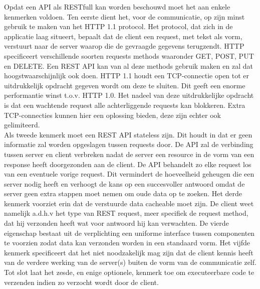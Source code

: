 Opdat een API als RESTfull kan worden beschouwd moet het aan enkele kenmerken voldoen.\newline
Ten eerste dient het, voor de communicatie, op zijn minst gebruik te maken van het HTTP 1.1 protocol. Het protocol, dat zich in de applicatie laag situeert,
bepaalt dat de client een request, met tekst als vorm, verstuurt naar de server waarop die de gevraagde gegevens terugzendt.
HTTP specificeert verschillende soorten requests methods waaronder GET, POST, PUT en DELETE. Een REST API kan van al deze methods gebruik maken en zal dat
hoogstwaarschijnlijk ook doen. HTTP 1.1 houdt een TCP-connectie open tot er uitdrukkelijk opdracht gegeven wordt om deze te sluiten.
Dit geeft een enorme performantie winst t.o.v. HTTP 1.0. Het nadeel van deze uitdrukkelijke opdracht is dat een wachtende request alle achterliggende requests kan blokkeren.
Extra TCP-connecties kunnen hier een oplossing bieden, deze zijn echter ook gelimiteerd.\newline
~\autocite{w3Protocol}\\
Als tweede kenmerk moet een REST API stateless zijn. Dit houdt in dat er geen informatie zal worden opgeslagen tussen requests door.
De API zal de verbinding tussen server en client verbreken nadat de server een resource in de vorm van een response heeft doorgezonden aan de client.
De API behandelt zo elke request los van een eventuele vorige request. Dit vermindert de hoeveelheid geheugen die een server nodig heeft en verhoogt de
kans op een succesvoller antwoord omdat de server geen extra stappen moet nemen om oude data op te zoeken.\newline
Het derde kenmerk voorziet erin dat de verstuurde data cacheable moet zijn. De client weet namelijk a.d.h.v het type van REST request,
meer specifiek de request method, dat hij verzonden heeft wat voor antwoord hij kan verwachten.\newline
De vierde eigenschap bestaat uit de verplichting een uniforme interface tussen componenten te voorzien zodat data kan verzonden worden in een standaard vorm.\newline
Het vijfde kenmerk specificeert dat het niet noodzakelijk mag zijn dat de client kennis heeft van de verdere werking van de server(s) buiten de vorm van de communicatie zelf.\newline
Tot slot laat het zesde, en enige optionele, kenmerk toe om executeerbare code te verzenden indien zo verzocht wordt door de client.\newline
~\autocite{redhat}\\

